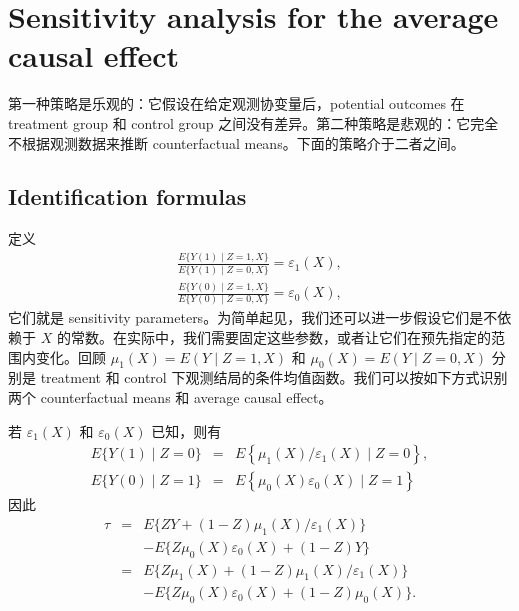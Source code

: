  
 


 
\section{Sensitivity analysis for the average causal effect}


 
第一种策略是乐观的：它假设在给定观测协变量后，potential outcomes 在 treatment group 和 control group 之间没有差异。第二种策略是悲观的：它完全不根据观测数据来推断 counterfactual means。下面的策略介于二者之间。



\subsection{Identification formulas}

定义
\begin{eqnarray*}
\frac{ E\{ Y(1)\mid Z=1, X \} }{ E\{ Y(1)\mid Z=0, X \} } = \varepsilon_1(X), \\
\frac{ E\{ Y(0)\mid Z=1, X \} }{ E\{ Y(0)\mid Z=0, X \} } = \varepsilon_0(X) ,
\end{eqnarray*}
它们就是 sensitivity parameters。为简单起见，我们还可以进一步假设它们是不依赖于 $X$ 的常数。在实际中，我们需要固定这些参数，或者让它们在预先指定的范围内变化。回顾 $\mu_1(X) = E(Y\mid Z=1, X)$ 和 $\mu_0(X) = E(Y\mid Z=0, X)$ 分别是 treatment 和 control 下观测结局的条件均值函数。我们可以按如下方式识别两个 counterfactual means 和 average causal effect。

\begin{theorem}
\label{thm::outcome-reg-sensitivity}
若 $\varepsilon_1(X)$ 和 $ \varepsilon_0(X) $ 已知，则有
\begin{eqnarray*}
E\{ Y(1)\mid Z=0 \}   &=& E\left\{\mu_1(X)   / \varepsilon_1(X)  \mid Z=0\right\},\\ 
E\{ Y(0)\mid Z=1 \}   &=& E\left\{\mu_0(X)    \varepsilon_0(X)  \mid Z=1\right\}
\end{eqnarray*} 
因此
\begin{eqnarray}
\tau & = & E\{ ZY + (1-Z) \mu_1(X)   / \varepsilon_1(X)\}  \nonumber  \\
 && - E\{ Z \mu_0(X)    \varepsilon_0(X) + (1-Z)Y\}  \label{eq::predictive}\\
& = & E\{ Z \mu_1(X) + (1-Z) \mu_1(X)   / \varepsilon_1(X)\}  \nonumber \\
&&- E\{ Z \mu_0(X)    \varepsilon_0(X) + (1-Z) \mu_0(X)\}. \label{eq::projective}
\end{eqnarray}
\end{theorem}


